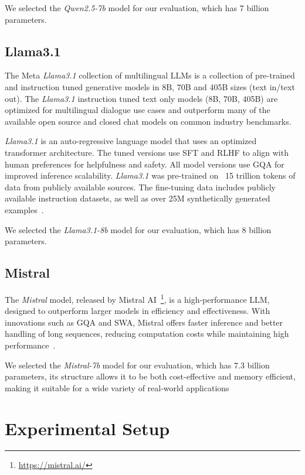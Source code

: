 We selected the \textit{Qwen2.5-7b} model for our evaluation, which has 7 billion parameters.

\subsection{Llama3.1}\label{subsec:empirical-evaluation:candidate-models:llama3.1}
The Meta \textit{Llama3.1} collection of multilingual LLMs is a collection of pre-trained and instruction tuned generative models in 8B, 70B and 405B sizes (text in/text out).
The \textit{Llama3.1} instruction tuned text only models (8B, 70B, 405B) are optimized for multilingual dialogue use cases and outperform many of the available open source and closed chat models on common industry benchmarks.

\textit{Llama3.1} is an auto-regressive language model that uses an optimized transformer architecture.
The tuned versions use \ac{SFT} and \ac{RLHF} to align with human preferences for helpfulness and safety.
All model versions use \ac{GQA} for improved inference scalability.
\textit{Llama3.1} was pre-trained on ~15 trillion tokens of data from publicly available sources.
The fine-tuning data includes publicly available instruction datasets, as well as over 25M synthetically generated examples~\cite{dubey2024llama3herdmodels,meta2023llama3}.

We selected the \textit{Llama3.1-8b} model for our evaluation, which has 8 billion parameters.

\subsection{Mistral}\label{subsec:empirical-evaluation:candidate-models:mistral}
The \textit{Mistral} model, released by Mistral AI~\footnote{\url{https://mistral.ai/}}, is a high-performance LLM, designed to outperform larger models in efficiency and effectiveness.
With innovations such as \ac{GQA} and \ac{SWA}, Mistral offers faster inference and better handling of long sequences, reducing computation costs while maintaining high performance~\cite{jiang2023mistral7b,mistral7b_2023}.

We selected the \textit{Mistral-7b} model for our evaluation, which has 7.3 billion parameters, its structure allows it to be both cost-effective and memory efficient, making it suitable for a wide variety of real-world applications
\section{Experimental Setup}\label{sec:empirical-evaluation:experimental-setup}
